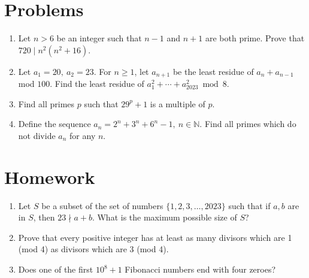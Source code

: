 \documentclass{article}
\begin{document}
\section{Problems}
\begin{enumerate}
  \item Let $n>6$ be an integer such that $n-1$ and $n+1$ are both prime. Prove
    that $720\mid n^2(n^2+16)$.
  \item Let $a_1=20,\ a_2=23$. For $n\ge 1$, let $a_{n+1}$ be the least residue
    of $a_n+a_{n-1}$ mod $100$. Find the least residue of
    $a_1^2+\cdots+a_{2023}^2\bmod 8$.
  \item Find all primes $p$ such that $29^p+1$ is a multiple of $p$.
  \item Define the sequence $a_n=2^n+3^n+6^n-1,\ n\in\mathbb N$.
    Find all primes which do not divide $a_n$ for any $n$.
\end{enumerate}
\newpage
\section{Homework}
\begin{enumerate}
  \item Let $S$ be a subset of the set of numbers $\{1, 2, 3,\ldots, 2023\}$
    such that if $a,b$ are in $S$, then $23\nmid a+b$. What is the maximum
    possible size of $S$?
  \item Prove that every positive integer has at least as many divisors which
    are 1 (mod 4) as divisors which are 3 (mod 4).
  \item Does one of the first $10^8+1$ Fibonacci numbers end with four zeroes?
\end{enumerate}
\end{document}
